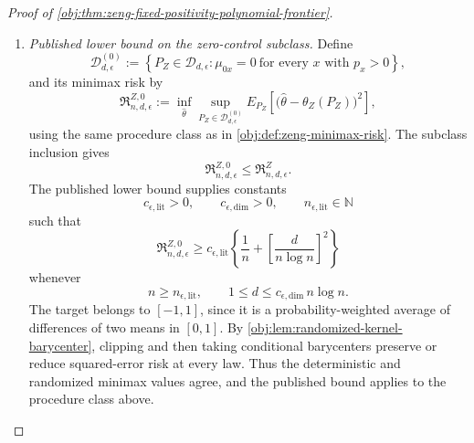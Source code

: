 \documentclass[11pt]{article}
\begin{document}
\begin{proof}[Proof of \cref{obj:thm:zeng-fixed-positivity-polynomial-frontier}]
\begin{enumerate}
The mixed-count estimator takes values in \([-1,1]\), by its clipped
output and averaging construction in \cref{obj:def:mixed-count-estimator}.
Hence, for every sample,
\[
-2^n
\le
\sum_{\mathbf u\in\{0,1\}^n}
\widehat\tau^{\mathrm{mix}}_{n,d,\epsilon}
\bigl(o_1(u_1),\ldots,o_n(u_n)\bigr)
\le2^n,
\]
so
\[
-1\le
\widehat\theta^{\mathrm{poly}}_{n,d,\epsilon}(\mathbf z)
\le1.
\]
This finite-sample map is measurable and is an admissible deterministic
procedure in \cref{obj:def:zeng-minimax-risk}. The defining infimum and
the preceding bounds therefore give
\[
\begin{split}
\mathfrak R^Z_{n,d,\epsilon}
&\le
\sup_{P_Z\in\mathcal D_{d,\epsilon}}
E_{P_Z}\!\left[
\left(
\widehat\theta^{\mathrm{poly}}_{n,d,\epsilon}(\mathbf Z_n)
-\theta_Z(P_Z)
\right)^2
\right]\\
&\le \overline C\,r_{n,d,\epsilon}
\le C_{\epsilon,\mathrm{up}}\,r^{\mathrm{fix}}_{n,d},
\qquad
C_{\epsilon,\mathrm{up}}
:=
\overline C\,\gamma_{\epsilon,\mathrm{cmp}}^2>0.
\end{split}
\]

\item \textit{Published lower bound on the zero-control subclass.}
Define
\[
\mathcal D^{(0)}_{d,\epsilon}
:=
\left\{
P_Z\in\mathcal D_{d,\epsilon}:
\mu_{0x}=0\ \text{for every }x\text{ with }p_x>0
\right\},
\]
and its minimax risk by
\[
\mathfrak R^{Z,0}_{n,d,\epsilon}
:=
\inf_{\widehat\theta}
\sup_{P_Z\in\mathcal D^{(0)}_{d,\epsilon}}
E_{P_Z}\!\left[
\bigl(\widehat\theta-\theta_Z(P_Z)\bigr)^2
\right],
\]
using the same procedure class as in
\cref{obj:def:zeng-minimax-risk}. The subclass inclusion gives
\[
\mathfrak R^{Z,0}_{n,d,\epsilon}
\le
\mathfrak R^Z_{n,d,\epsilon}.
\]
The published lower bound
\citep[Theorem~2, Section~3.2, p.~9, and its zero-control construction
in Section~C.5, pp.~39--44]{ZengBalakrishnanHanKennedy2026}
supplies constants
\[
c_{\epsilon,\mathrm{lit}}>0,
\qquad
c_{\epsilon,\mathrm{dim}}>0,
\qquad
n_{\epsilon,\mathrm{lit}}\in\mathbb N
\]
such that
\[
\mathfrak R^{Z,0}_{n,d,\epsilon}
\ge
c_{\epsilon,\mathrm{lit}}
\left\{
\frac1n+\left[\frac d{n\log n}\right]^2
\right\}
\]
whenever
\[
n\ge n_{\epsilon,\mathrm{lit}},
\qquad
1\le d\le c_{\epsilon,\mathrm{dim}}\,n\log n.
\]
The target belongs to \([-1,1]\), since it is a probability-weighted
average of differences of two means in \([0,1]\). By
\cref{obj:lem:randomized-kernel-barycenter}, clipping and then taking
conditional barycenters preserve or reduce squared-error risk at
every law. Thus the deterministic and randomized minimax values agree,
and the published bound applies to the procedure class above.


\end{enumerate}
\end{proof}
\end{document}
